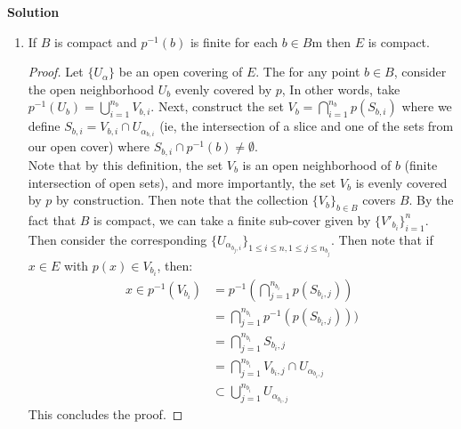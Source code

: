 \documentclass[12pt]{article}
\newcounter{AnswerCounter}
\newcounter{SubAnswerCounter}
\newenvironment{answer}[0]{
  \setcounter{SubAnswerCounter}{1}
  \bigskip
  \textbf{Solution \arabic{AnswerCounter}}
  \\
  \begin{small}
}{
  \end{small}
  \stepcounter{AnswerCounter}
}
\begin{document}
\begin{answer}[Page 341, \#6]
\begin{enumerate}
\begin{proof}
\end{proof}
Next, we prove that if $B$ is completely regular, then $E$ is also completely regular.
\begin{proof}
If $B$ is completely regular, then for every closed subset $C \subset B$ and every point  $b \in B \setminus C$, there is a continuous function $f :B->[0,1]$ such that $f(B \setminus C)=0$ and $f(b)={1}$. We must show the same holds for $E$. Consider a point $e \in E$ and its open neighborhood $U_e$, and note that $\exists b = p(e) \in B$. Now consider the open neighborhood $V$ of $b$ that is evenly covered by $p$ (ie, we have $p^{-1}(V) = \bigcup_{\alpha} V_{\alpha}$ with $e \in V_{\alpha_e}$ for some $\alpha_e$). The construct the closed set $C = B \setminus (p(U_e) \cap V)$. By complete regularity of $B$, there exists $f: B \to [0,1]$ such that $f(b) = 1$ and $f(C) = 0$. Then consider the function defined by $f \circ p: E \to [0,1]$ where we define $f'(x) = f(p(x))$ if $x \in U_e \cap V_{\alpha_e}$ and $f(x) = 0$ otherwise. Note that this function is continuous, and fulfills the properties required for complete regularity, and therefore $E$ is completely regular.
\end{proof}
\item If $B$ is compact and $p^{-1}(b)$ is finite for each $b \in B$m then $E$ is compact.
\begin{proof}
Let $\{ U_{\alpha}\}$ be an open covering of $E$. The for any point $b \in B$, consider the open neighborhood $U_b$ evenly covered by $p$, In other words, take $p^{-1}(U_b) = \bigcup_{i=1}^{n_b} V_{b,i}$. Next, construct the set $V_{b} = \bigcap_{i=1}^{n_b} p(S_{b,i})$ where we define $S_{b,i} = V_{b,i} \cap U_{\alpha_{b,i}}$ (ie, the intersection of a slice and one of the sets from our open cover) where $S_{b,i} \cap p^{-1}(b) \neq \emptyset$. \\

Note that by this definition, the set $V_{b}$ is an open neighborhood of $b$ (finite intersection of open sets), and more importantly, the set $V_b$ is evenly covered by $p$ by construction. Then note that the collection $\{V_b\}_{b \in B}$ covers $B$. By the fact that $B$ is compact, we can take a finite sub-cover given by $\{V'_{b_i}\}_{i = 1}^n$. Then consider the corresponding $\{U_{\alpha_{{b_j},i}} \}_{1 \leq i \leq n, 1 \leq j \leq n_{b_j}}$. Then note that if $x \in E$ with $p(x) \in V_{b_i}$, then:
\begin{align*}
x \in p^{-1}(V_{b_i}) &= p^{-1}(\bigcap_{j=1}^{n_{b_i}} p(S_{b_i,j})) \\
&=  \bigcap_{j=1}^{n_{b_i}} p^{-1}(p(S_{b_i,j}))) \\
&= \bigcap_{j=1}^{n_{b_i}} S_{b_i,j} \\
&=\bigcap_{j=1}^{n_{b_i}} V_{b_i,j} \cap U_{\alpha_{b_i,j}} \\
&\subset \bigcup_{j=1}^{n_{b_i}} U_{\alpha_{b_i,j}}
\end{align*}
This concludes the proof.
\end{proof}
\end{enumerate}
\end{answer}
\end{document}
